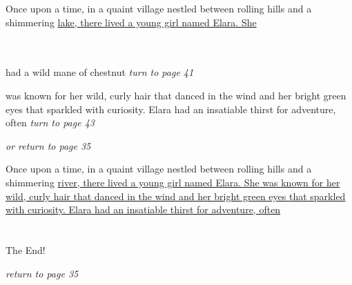 \documentclass{memoir}
\begin{document}
        


        \hspace{1cm}\vfill
        \begin{minipage}{3in}
        \LARGE
        Once upon a time, in a quaint village nestled between rolling hills and a shimmering \ul{lake, there lived a young girl named Elara. She}\\ \vspace{5mm} \\
  \\ 

        \hspace{1cm}\begin{minipage}{6cm}
        \normalsize
            had a wild mane of chestnut  \hfill \textit{turn to page 41}\\ \vspace{5mm}

was known for her wild, curly hair that danced in the wind and her bright green eyes that sparkled with curiosity. Elara had an insatiable thirst for adventure, often \hfill \textit{turn to page 43}\\ \vspace{5mm}

\hfill \textit{or return to page 35}
        \end{minipage} 
        \end{minipage}
        \hspace{1cm}\vfill
        \cleardoublepage

        


        \hspace{1cm}\vfill
        \begin{minipage}{3in}
        \LARGE
        Once upon a time, in a quaint village nestled between rolling hills and a shimmering \ul{river, there lived a young girl named Elara. She was known for her wild, curly hair that danced in the wind and her bright green eyes that sparkled with curiosity. Elara had an insatiable thirst for adventure, often}\\ \vspace{5mm} \\
 \\\vspace{1cm} The End! \\ 

        \hspace{1cm}\begin{minipage}{6cm}
        \normalsize
            \hfill \textit{return to page 35}
        \end{minipage} 
        \end{minipage}
        \hspace{1cm}\vfill
        \cleardoublepage
\end{document}
